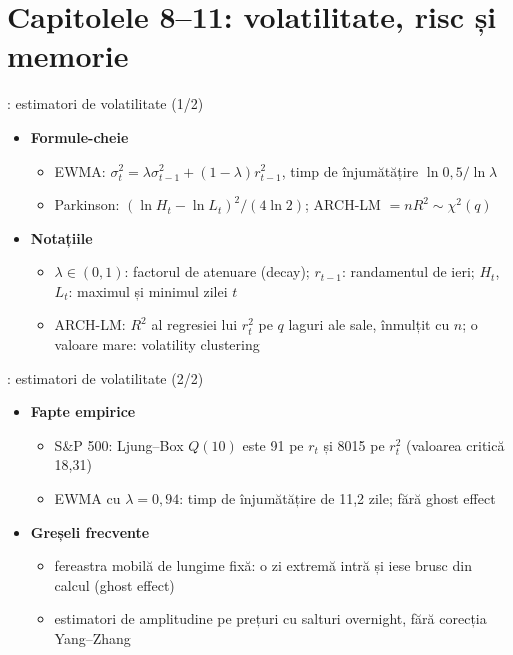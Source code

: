 \section{Capitolele 8--11: volatilitate, risc și memorie}

\begin{frame}{: estimatori de volatilitate (1/2)}
\itemsize{\small}
\begin{itemize}
    \item \textbf{Formule-cheie}
    \begin{itemize}
        \item EWMA: $\sigma_t^2 = \lambda\sigma_{t-1}^2 + (1 - \lambda)r_{t-1}^2$, timp de înjumătățire $\ln 0{,}5/\ln\lambda$ 
        \item Parkinson: $(\ln H_t - \ln L_t)^2/(4\ln 2)$; ARCH-LM $= nR^2 \sim \chi^2(q)$
    \end{itemize}
    \item \textbf{Notațiile}
    \begin{itemize}
        \item $\lambda \in (0, 1)$: factorul de atenuare (decay); $r_{t-1}$: randamentul de ieri; $H_t$, $L_t$: maximul și minimul zilei $t$
        \item ARCH-LM: $R^2$ al regresiei lui $r_t^2$ pe $q$ laguri ale sale, înmulțit cu $n$; o valoare mare: volatility clustering
    \end{itemize}
\end{itemize}
\end{frame}

\begin{frame}{: estimatori de volatilitate (2/2)}
\itemsize{\small}
\begin{itemize}
    \item \textbf{Fapte empirice}
    \begin{itemize}
        \item S\&P 500: Ljung--Box $Q(10)$ este 91 pe $r_t$ și 8015 pe $r_t^2$ (valoarea critică 18{,}31)
        \item EWMA cu $\lambda = 0{,}94$: timp de înjumătățire de 11{,}2 zile; fără ghost effect
    \end{itemize}
    \item \textbf{Greșeli frecvente}
    \begin{itemize}
        \item fereastra mobilă de lungime fixă: o zi extremă intră și iese brusc din calcul (ghost effect)
        \item estimatori de amplitudine pe prețuri cu salturi overnight, fără corecția Yang--Zhang
    \end{itemize}
\end{itemize}
\end{frame}

